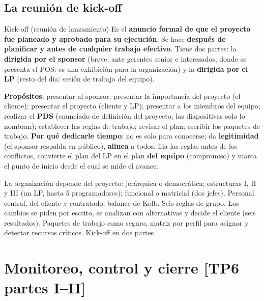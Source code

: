 \documentclass[11pt,a4paper]{article}
\begin{document}
\subsection{La reunión de kick-off}
\begin{defbox}{Kick-off (reunión de lanzamiento)}
Es el \textbf{anuncio formal de que el proyecto fue planeado y aprobado para su ejecución}. Se hace
\textbf{después de planificar y antes de cualquier trabajo efectivo}. Tiene dos partes: la \textbf{dirigida por
el sponsor} (breve, ante gerentes senior e interesados, donde se presenta el POS: es una exhibición para la
organización) y la \textbf{dirigida por el LP} (resto del día: sesión de trabajo del equipo).
\end{defbox}
\textbf{Propósitos}: presentar al sponsor; presentar la importancia del proyecto (el cliente); presentar el
proyecto (cliente y LP); presentar a los miembros del equipo; realizar el \textbf{PDS} (enunciado de definición
del proyecto; las diapositivas solo lo nombran); establecer las reglas de trabajo; revisar el plan; escribir los paquetes de trabajo. \textbf{Por qué
dedicarle tiempo}: no es solo para conocerse; da \textbf{legitimidad} (el sponsor respalda en público),
\textbf{alinea} a todos, fija las reglas antes de los conflictos, convierte el plan del LP en el plan
\textbf{del equipo} (compromiso) y marca el punto de inicio desde el cual se mide el avance.

\begin{enresumen}
La organización depende del proyecto: jerárquica o democrática; estructuras I, II y III (un LP, hasta 5
programadores); funcional o matricial (dos jefes). Personal central, del cliente y contratado; balance de Kolb.
Seis reglas de grupo. Los cambios se piden por escrito, se analizan con alternativas y decide el cliente (seis
resultados). Paquetes de trabajo como seguro; matriz por perfil para asignar y detectar recursos críticos.
Kick-off en dos partes.
\end{enresumen}

\section[Monitoreo, control y cierre]{Monitoreo, control y cierre \hfill {\normalsize [TP6 partes I--II]}}
\end{document}
